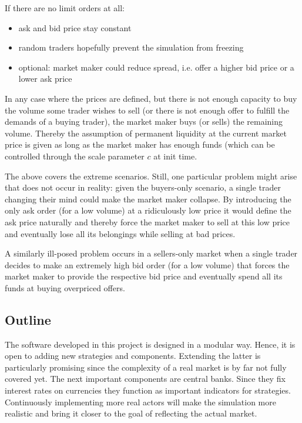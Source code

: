 If there are no limit orders at all:
\begin{itemize}
    \item ask and bid price stay constant
    \item random traders hopefully prevent the simulation from freezing
    \item optional: market maker could reduce spread, i.e. offer a higher bid price
    or a lower ask price
\end{itemize}

In any case where the prices are defined, but there is not enough capacity to buy the
volume some trader wishes to sell (or there is not enough offer to fulfill the demands
of a buying trader), the market maker buys (or sells) the remaining volume. Thereby the
assumption of permanent liquidity at the current market price is given as long as the
market maker has enough funds (which can be controlled through the scale parameter $c$
at init time.

The above covers the extreme scenarios. Still, one particular problem might arise that
does not occur in reality: given the buyers-only scenario, a single trader changing
their mind could make the market maker collapse. By introducing the only ask order (for a low volume) at
a ridiculously low price it would define the ask price naturally and thereby force
the market maker to sell at this low price and eventually lose all its belongings
while selling at bad prices.

A similarly ill-posed problem occurs in a sellers-only market when a single trader
decides to make an extremely high bid order (for a low volume) that forces the market
maker to provide the respective bid price and eventually spend all its funds at buying
overpriced offers.

\subsection{Outline}
The software developed in this project is designed in a modular way. Hence, it is open
to adding new strategies and components. Extending the latter is particularly
promising since the complexity of a real market is by far not fully covered yet. The next
important components are central banks. Since they fix interest rates on currencies
they function as important indicators for strategies. Continuously implementing more
real actors will make the simulation more realistic and bring it closer to the goal
of reflecting the actual market.


